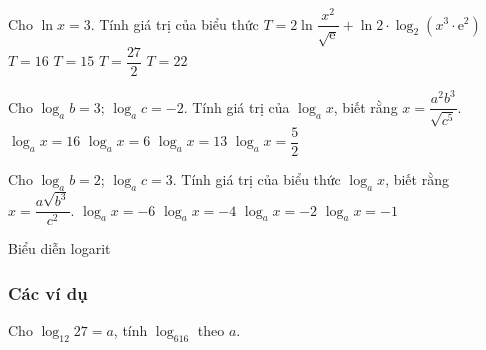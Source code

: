 \begin{ex}%
	Cho $\ln x=3$. Tính giá trị của biểu thức $T=2\ln \dfrac{x^2}{\sqrt{\mathrm{e}}}+\ln 2\cdot\log_2\left(x^3\cdot\mathrm{e}^2\right)$ 
	\choice
	{$T=16$}
	{$T=15$}
	{$T=\dfrac{27}{2}$}
	{\True $T=22$}
\end{ex}

\begin{ex}%
	Cho $\log_ab=3$; $\log_ac=-2$. Tính giá trị của $\log_ax$, biết rằng $x=\dfrac{a^2b^3}{\sqrt{c^5}}$. 
	\choice
	{\True $\log_ax=16$}
	{$\log_ax=6$}
	{$\log_ax=13$}
	{$\log_ax=\dfrac{5}{2}$}
\end{ex}

\begin{ex}%
	Cho $\log_ab=2$; $\log_ac=3$. Tính giá trị của biểu thức $\log_ax$, biết rằng $x=\dfrac{a\sqrt{b^3}}{c^2}$.
	\choice
	{$\log_ax=-6$}
	{$\log_ax=-4$}
	{\True $\log_ax=-2$}
	{$\log_ax=-1$}
\end{ex}





\begin{dang}{Biểu diễn logarit}
\end{dang}
\subsubsection{Các ví dụ}
		
\begin{vd}%
	Cho $\log_{12}27=a$, tính $\log_616$ theo $a$.
\end{vd}

